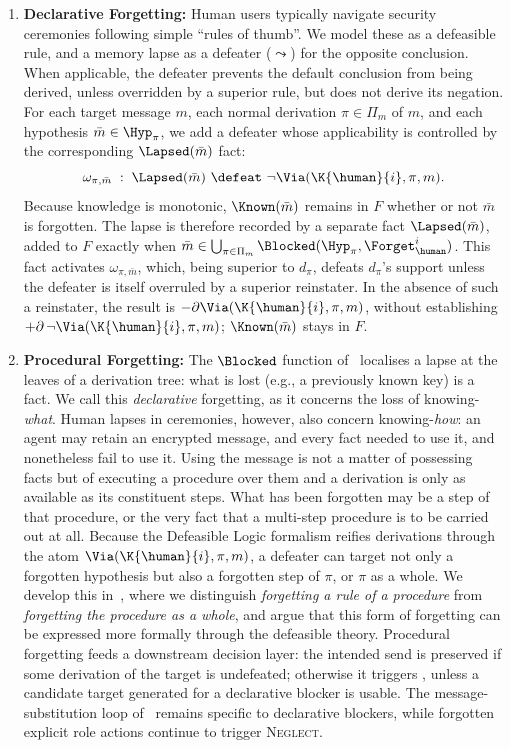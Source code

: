 \begin{enumerate}
    \item \textbf{Declarative Forgetting:} 
    Human users typically navigate security ceremonies following simple ``rules of thumb''. We model these as a defeasible rule, and a memory lapse as a defeater ($\leadsto$) for the opposite conclusion. When applicable, the defeater prevents the default conclusion from being derived, unless overridden by a superior rule, but does not derive its negation. For each target message $m$, each normal derivation $\pi\in\Pi_m$ of $m$, and each hypothesis $\bar{m}\in\Hyp_\pi$, we add a defeater whose applicability is controlled by the corresponding $\Lapsed(\bar m)$ fact:
    \[
    \omega_{\pi,\bar m} \;:\; \Lapsed(\bar m)\ \defeat\ \neg\Via(\K{\human}{i}, \pi, m).    
    \]
    Because knowledge is monotonic, $\Known({\bar{m}})$ remains in $F$ whether or not $\bar{m}$ is forgotten. The lapse is therefore recorded by a separate fact $\Lapsed(\bar{m})$, added to $F$ exactly when $\bar{m} \in \bigcup_{\pi \in \Pi_m} \Blocked(\Hyp_\pi, \Forget_{\human}^i)$. This fact activates $\omega_{\pi,\bar m}$, which, being superior to $d_\pi$, defeats $d_\pi$'s support unless the defeater is itself overruled by a superior reinstater. In the absence of such a reinstater, the result is $-\partial\Via(\K{\human}{i}, \pi, m)$, without establishing $+\partial\,\neg\Via(\K{\human}{i}, \pi, m)$; $\Known({\bar{m}})$ stays in $F$.
    
    \item \textbf{Procedural Forgetting:} The $\Blocked$ function of~ localises a lapse at the leaves of a derivation tree: what is lost (e.g., a previously known key) is a fact. We call this \emph{declarative} forgetting, as it concerns the loss of knowing-\emph{what}. Human lapses in ceremonies, however, also concern knowing-\emph{how}: an agent may retain an encrypted message, and every fact needed to use it, and nonetheless fail to use it. Using the message is not a matter of possessing facts but of executing a procedure over them and a derivation is only as available as its constituent steps. What has been forgotten may be a step of that procedure, or the very fact that a multi-step procedure is to be carried out at all. Because the Defeasible Logic formalism reifies derivations through the atom $\Via(\K{\human}{i}, \pi, m)$, a defeater can target not only a forgotten hypothesis but also a forgotten step of $\pi$, or $\pi$ as a whole. We develop this in~, where we distinguish \emph{forgetting a rule of a procedure} from \emph{forgetting the procedure as a whole}, and argue that this form of forgetting can be expressed more formally through the defeasible theory. Procedural forgetting feeds a downstream decision layer: the intended send is preserved if some derivation of the target is undefeated; otherwise it triggers \skipmutation{}, unless a candidate target generated for a declarative blocker is usable. The message-substitution loop of~ remains specific to declarative blockers, while forgotten explicit role actions continue to trigger \textsc{Neglect}.
    

\end{enumerate}
